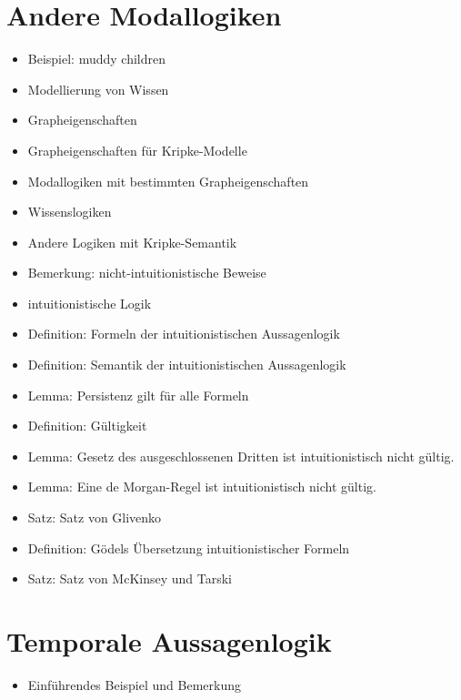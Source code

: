 \documentclass[8pt,fleqn,a4paper,twoside]{article}
\begin{document}
\begin{multicols}{2}
  \section{Andere Modallogiken} %
  \label{sec:andere_modallogiken}
    \begin{itemize}
      \item Beispiel: muddy children
      \item Modellierung von Wissen
      \item Grapheigenschaften
      \item Grapheigenschaften für Kripke-Modelle
      \item Modallogiken mit bestimmten Grapheigenschaften
      \item Wissenslogiken
      \item Andere Logiken mit Kripke-Semantik
      \item Bemerkung: nicht-intuitionistische Beweise
      \item intuitionistische Logik
      \item Definition: Formeln der intuitionistischen Aussagenlogik
      \item Definition: Semantik der intuitionistischen Aussagenlogik
      \item Lemma: Persistenz gilt für alle Formeln
      \item Definition: Gültigkeit
      \item Lemma: Gesetz des ausgeschlossenen Dritten ist intuitionistisch nicht gültig.
      \item Lemma: Eine de Morgan-Regel ist intuitionistisch nicht gültig.
      \item Satz: Satz von Glivenko
      \item Definition: Gödels Übersetzung intuitionistischer Formeln
      \item Satz: Satz von McKinsey und Tarski
    \end{itemize}

  \section{Temporale Aussagenlogik} %
  \label{sec:temporale_aussagenlogik}

    \begin{itemize}
      \item Einführendes Beispiel und Bemerkung
    \end{itemize}


\end{multicols}
\end{document}
